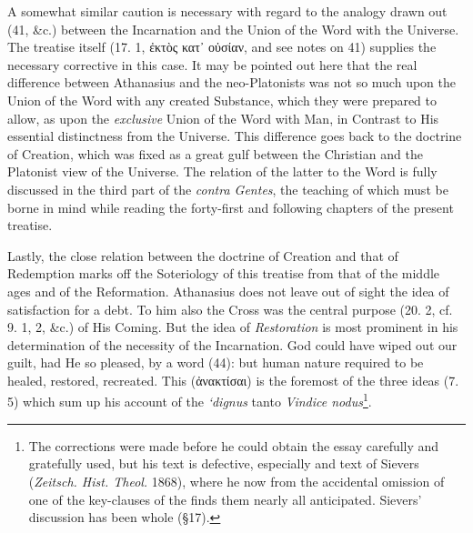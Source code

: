 A somewhat similar caution is necessary with regard to the analogy drawn out (41, \&c.) between the Incarnation and the Union of the Word with the Universe. The treatise itself (17. 1, \textgreek{ἐκτὸς κατ᾽ οὐσίαν}, and see notes on 41) supplies the necessary corrective in this case. It may be pointed out here that the real difference between Athanasius and the neo-Platonists was not so much upon the Union of the Word with any created Substance, which they were prepared to allow, as upon the \emph{exclusive} Union of the Word with Man, in Contrast to His essential distinctness from the Universe. This difference goes back to the doctrine of Creation, which was fixed as a great gulf between the Christian and the Platonist view of the Universe. The relation of the latter to the Word is fully discussed in the third part of the \emph{contra Gentes}, the teaching of which must be borne in mind while reading the forty-first and following chapters of the present treatise.

Lastly, the close relation between the doctrine of Creation and that of Redemption marks off the Soteriology of this treatise from that of the middle ages and of the Reformation. Athanasius does not leave out of sight the idea of satisfaction for a debt. To him also the Cross was the central purpose (20. 2, cf. 9. 1, 2, \&c.) of His Coming. But the idea of \emph{Restoration} is most prominent in his determination of the necessity of the Incarnation. God could have wiped out our guilt, had He so pleased, by a word (44): but human nature required to be healed, restored, recreated. This (\textgreek{ἀνακτίσαι}) is the foremost of the three ideas (7. 5) which sum up his account of the \emph{‘dignus} tanto \emph{Vindice nodus}\footnote{The corrections were made before he could obtain the essay carefully and gratefully used, but his text is defective, especially and text of Sievers (\emph{Zeitsch. Hist. Theol.} 1868), where he now from the accidental omission of one of the key-clauses of the finds them nearly all anticipated. Sievers’ discussion has been whole (§17).}.

